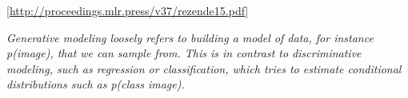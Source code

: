 \documentclass[
  11pt,
]{book}
\begin{document}
{[}\url{http://proceedings.mlr.press/v37/rezende15.pdf}{]}

\emph{Generative modeling loosely refers to building a model of data, for instance p(image), that we can sample from. This is in contrast to discriminative modeling, such as regression or classification, which tries to estimate conditional distributions such as p(class \textbar{} image).}

\hypertarget{section}{%
\section{}\label{section}}

  
\end{document}
